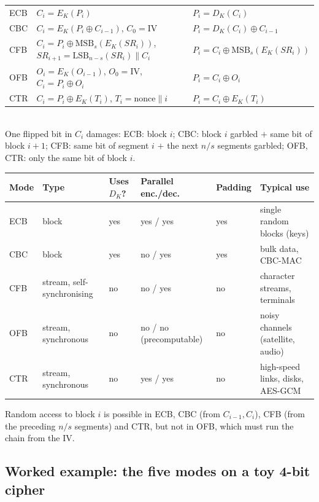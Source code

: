 \begin{mustknow}
\begin{tabular}{@{}l l l@{}}
ECB & $C_i = E_K(P_i)$ & $P_i = D_K(C_i)$\\
CBC & $C_i = E_K(P_i \oplus C_{i-1})$, \;$C_0 = \mathrm{IV}$ & $P_i = D_K(C_i) \oplus C_{i-1}$\\
CFB & $C_i = P_i \oplus \mathrm{MSB}_s(E_K(SR_i))$, \;$SR_{i+1} = \mathrm{LSB}_{n-s}(SR_i) \| C_i$ & $P_i = C_i \oplus \mathrm{MSB}_s(E_K(SR_i))$\\
OFB & $O_i = E_K(O_{i-1})$, \;$O_0 = \mathrm{IV}$, \;$C_i = P_i \oplus O_i$ & $P_i = C_i \oplus O_i$\\
CTR & $C_i = P_i \oplus E_K(T_i)$, \;$T_i = \text{nonce} \| i$ & $P_i = C_i \oplus E_K(T_i)$
\end{tabular}\\[2pt]
One flipped bit in $C_i$ damages: ECB: block $i$; CBC: block $i$ garbled $+$ same bit of block $i+1$; CFB: same bit of segment $i$ $+$ the next $n/s$ segments garbled; OFB, CTR: only the same bit of block $i$.
\end{mustknow}

\begin{center}\small
\begin{tabularx}{\textwidth}{@{}l l l l l X@{}}
\toprule
Mode & Type & Uses $D_K$? & Parallel enc./dec. & Padding & Typical use\\
\midrule
ECB & block & yes & yes / yes & yes & single random blocks (keys)\\
CBC & block & yes & no / yes & yes & bulk data, CBC-MAC\\
CFB & stream, self-synchronising & no & no / yes & no & character streams, terminals\\
OFB & stream, synchronous & no & no / no (precomputable) & no & noisy channels (satellite, audio)\\
CTR & stream, synchronous & no & yes / yes & no & high-speed links, disks, AES-GCM\\
\bottomrule
\end{tabularx}
\end{center}
Random access to block $i$ is possible in ECB, CBC (from $C_{i-1}, C_i$), CFB (from the preceding $n/s$ segments) and CTR, but not in OFB, which must run the chain from the IV.

\subsection{Worked example: the five modes on a toy 4-bit cipher \hot\new}

